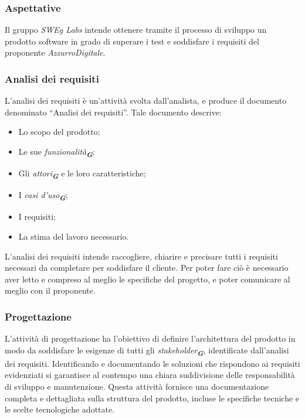 \subsubsection{Aspettative}
Il gruppo \emph{SWEg Labs} intende ottenere tramite il processo di sviluppo un prodotto software in grado di superare i test e soddisfare i requisiti del proponente \emph{AzzurroDigitale}.

\subsubsection{Analisi dei requisiti}

L’analisi dei requisiti è un’attività svolta dall’analista, e produce il documento denominato “Analisi dei requisiti”. 
Tale documento descrive:
\begin{itemize}
    \item Lo scopo del prodotto;
    \item Le sue \emph{funzionalità}\textsubscript{\textit{\textbf{G}}};
    \item Gli \emph{attori}\textsubscript{\textit{\textbf{G}}} e le loro caratteristiche;
    \item I \emph{casi d'uso}\textsubscript{\textit{\textbf{G}}};
    \item I requisiti;
    \item La stima del lavoro necessario.
\end{itemize}

L’analisi dei requisiti intende raccogliere, chiarire e precisare tutti i requisiti necessari da completare per soddisfare il cliente. Per poter fare ciò è necessario aver letto e compreso al meglio le specifiche del progetto, e poter comunicare al meglio con il proponente.



\subsubsection{Progettazione}

L'attività di progettazione ha l'obiettivo di definire l'architettura del prodotto in modo da soddisfare le esigenze di tutti gli \emph{stakeholder}\textsubscript{\textit{\textbf{G}}}, identificate dall’analisi dei requisiti. Identificando e documentando le soluzioni che rispondono ai requisiti evidenziati si garantisce al contempo una chiara suddivisione delle responsabilità di sviluppo e manutenzione. Questa attività fornisce una documentazione completa e dettagliata sulla struttura del prodotto, incluse le specifiche tecniche e le scelte tecnologiche adottate. 


